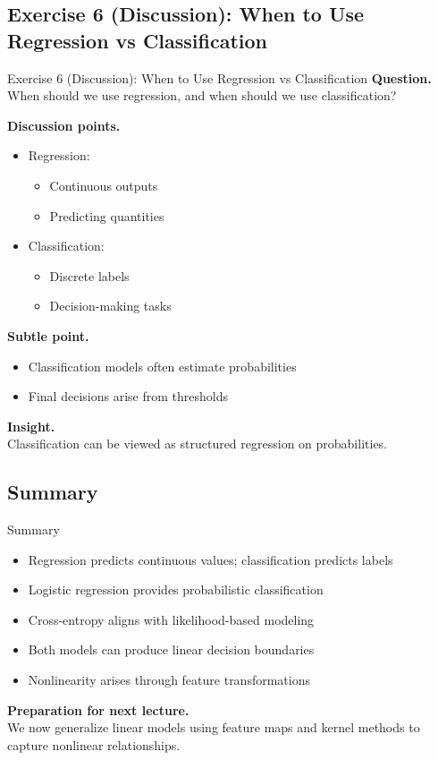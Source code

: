 \documentclass[aspectratio=169,11pt]{beamer}
\begin{document}
\subsection{Exercise 6 (Discussion): When to Use Regression vs Classification}
\begin{frame}[t,allowframebreaks]{Exercise 6 (Discussion): When to Use Regression vs Classification}
\small
\textbf{Question.}\\ When should we use regression, and when should we use classification?

\textbf{Discussion points.}\\ \begin{itemize}
    \item Regression:
    \begin{itemize}
        \item Continuous outputs
        \item Predicting quantities
    \end{itemize}

    \item Classification:
    \begin{itemize}
        \item Discrete labels
        \item Decision-making tasks
    \end{itemize}
\end{itemize}

\textbf{Subtle point.}\\ \begin{itemize}
    \item Classification models often estimate probabilities
    \item Final decisions arise from thresholds
\end{itemize}

\textbf{Insight.}\\ Classification can be viewed as structured regression on probabilities.
\end{frame}

\subsection{Summary}
\begin{frame}[t,allowframebreaks]{Summary}
\small
\begin{itemize}
    \item Regression predicts continuous values; classification predicts labels
    \item Logistic regression provides probabilistic classification
    \item Cross-entropy aligns with likelihood-based modeling
    \item Both models can produce linear decision boundaries
    \item Nonlinearity arises through feature transformations
\end{itemize}

\textbf{Preparation for next lecture.}\\ We now generalize linear models using feature maps and kernel methods to capture nonlinear relationships.
\end{frame}
\end{document}
